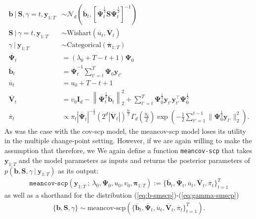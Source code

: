 \documentclass{article}
\begin{document}
\begin{align}
    \mathbf{b} \:|\: \mathbf{S}, \gamma = t, \mathbf{y}_{1:T} &\sim \mathcal{N}_d\left(\overline{\mathbf{b}}_t, \left[\overline{\boldsymbol{\Psi}}^{\frac{1}{2}}_t \mathbf{S} \overline{\boldsymbol{\Psi}}^{\frac{1}{2}}_t\right]^{-1} \right) \label{eq:b-smscp} \\
    \mathbf{S} \:|\: \gamma = t, \mathbf{y}_{1:T} &\sim \text{Wishart}(\overline{u}_t, \overline{\mathbf{V}}_t)  \\
    \gamma \:|\: \mathbf{y}_{1:T} &\sim \text{Categorical}(\overline{\boldsymbol{\pi}}_{1:T}) \label{eq:gamma-smscp} \\
    \overline{\boldsymbol{\Psi}}_t &= (\lambda_0 + T-t+1)\boldsymbol{\Psi}_0 \\
    \overline{\mathbf{b}}_t &= \overline{\boldsymbol{\Psi}}_t^{-1}\sum_{t'=t}^{T} \boldsymbol{\Psi}_0\mathbf{y}_{t'} \\
    \overline{u}_t &= u_0 + T - t + 1 \\
    \overline{\mathbf{V}}_t &= v_0\mathbf{I}_d - \left\lVert\overline{\boldsymbol{\Psi}}^{\frac{1}{2}}_t\overline{\mathbf{b}}_t\right\rVert_2^2 +  \sum_{t'=t}^{T} \boldsymbol{\Psi}_0^{\frac{1}{2}}\mathbf{y}_{t'} \mathbf{y}_{t'}^\intercal\boldsymbol{\Psi}_0^{\frac{1}{2}}\\
    \overline{\pi}_t &\propto \pi_t |\overline{\boldsymbol{\Psi}}_t |^{-\frac{1}{2}} \left(2^d |\overline{\mathbf{V}}_{t}|\right)^{\frac{\overline{u}_{t}}{2}}\Gamma_d\left(\frac{\overline{u}_{t}}{2}\right)\exp\left(- \frac{1}{2}\sum_{t'=1}^{t-1} \lVert\boldsymbol{\Psi}_0^{\frac{1}{2}}\mathbf{y}_{t'}\rVert_2^2\right).
\end{align}
As was the case with the cov-scp model, the meancov-scp model loses its utility in the multiple change-point setting. However, if we are again willing to make the assumption that  therefore, we We again define a function \texttt{meancov-scp} that takes $\mathbf{y}_{1:T}$ and the model parameters as inputs and returns the posterior parameters of $p(\mathbf{b}, \mathbf{S}, \gamma\:|\:\mathbf{y}_{1:T})$ as its output:
\begin{align}
    \texttt{meancov-scp}\left(\mathbf{y}_{1:T} \:;\: \lambda_0, \boldsymbol{\Psi}_0, u_0, v_0, \boldsymbol{\pi}_{1:T}\right) := \{\overline{\mathbf{b}}_t, \overline{\boldsymbol{\Psi}}_t, \overline{u}_t, \overline{\mathbf{V}}_t, \overline{\pi}_t\}_{t=1}^T
\end{align}
as well as a shorthand for the distribution (\ref{eq:b-smscp})-(\ref{eq:gamma-smscp})
\begin{align}
    \{\mathbf{b}, \mathbf{S}, \gamma\}\sim\text{meancov-scp}(\{\overline{\mathbf{b}}_t, \overline{\boldsymbol{\Psi}}_t, \overline{u}_t, \overline{\mathbf{V}}_t, \overline{\pi}_t\}_{t=1}^T).
\end{align}
\end{document}
